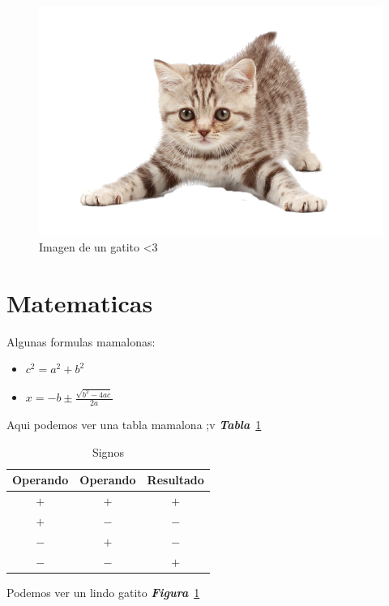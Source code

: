 \begin{figure}
  \includegraphics[scale=0.25]{21.png}
  \caption{Imagen de un gatito <3 }
  \label{fig:Gatito}
\end{figure}

\section{Matematicas}
Algunas formulas mamalonas:
\begin{itemize}
\item $c^2 = a^2 + b^2$  
\item $x = -b \pm \frac{\sqrt{b^2-4ac}}{2a}$
\end{itemize}

Aqui podemos ver una tabla mamalona ;v
\emph{\textbf{Tabla}}~\ref{tab:Signos}

\begin{table}[h]
  \centering
  \begin{tabular}{| c | c | c |}
    \hline
    Operando & Operando & Resultado\\\hline
    $+$ & $+$ & $+$\\\hline
    $+$ & $-$ & $-$\\\hline
    $-$ & $+$ & $-$\\\hline
    $-$ & $-$ & $+$\\\hline    
  \end{tabular}
  \caption{Signos}
  \label{tab:Signos}
\end{table}


Podemos ver un lindo gatito
\emph{\textbf{Figura}}~\ref{fig:Gatito}
